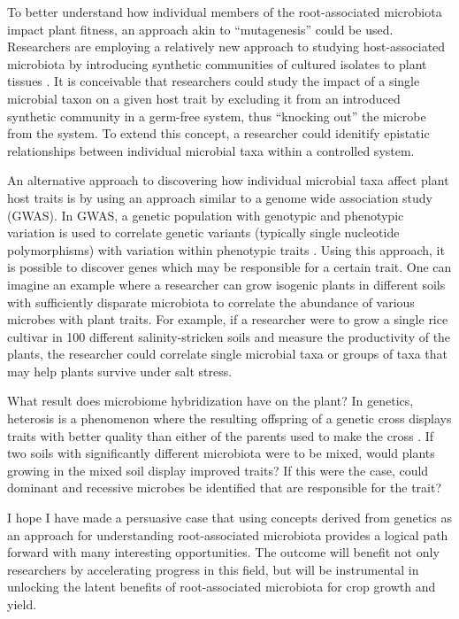 To better understand how individual members of the root-associated microbiota impact plant fitness, an approach akin to ``mutagenesis'' could be used. Researchers are employing a relatively new approach to studying host-associated microbiota by introducing synthetic communities of cultured isolates to plant tissues \cite{bodenhausen2014synthetic,bai2015functional,lebeis2015salicylic}. It is conceivable that researchers could study the impact of a single microbial taxon on a given host trait by excluding it from an introduced synthetic community in a germ-free system, thus ``knocking out'' the microbe from the system. To extend this concept, a researcher could idenitify epistatic relationships between individual microbial taxa within a controlled system.

An alternative approach to discovering how individual microbial taxa affect plant host traits is by using an approach similar to a genome wide association study (GWAS). In GWAS, a genetic population with genotypic and phenotypic variation is used to correlate genetic variants (typically single nucleotide polymorphisms) with variation within phenotypic traits \cite{hardy2009genomewide}. Using this approach, it is possible to discover genes which may be responsible for a certain trait. One can imagine an example where a researcher can grow isogenic plants in different soils with sufficiently disparate microbiota to correlate the abundance of various microbes with plant traits. For example, if a researcher were to grow a single rice cultivar in 100 different salinity-stricken soils and measure the productivity of the plants, the researcher could correlate single microbial taxa or groups of taxa that may help plants survive under salt stress.

What result does microbiome hybridization have on the plant? In genetics, heterosis is a phenomenon where the resulting offspring of a genetic cross displays traits with better quality than either of the parents used to make the cross \cite{stuber1992identification}. If two soils with significantly different microbiota were to be mixed, would plants growing in the mixed soil display improved traits? If this were the case, could dominant and recessive microbes be identified that are responsible for the trait?

I hope I have made a persuasive case that using concepts derived from genetics as an approach for understanding root-associated microbiota provides a logical path forward with many interesting opportunities. The outcome will benefit not only researchers by accelerating progress in this field, but will be instrumental in unlocking the latent benefits of root-associated microbiota for crop growth and yield.